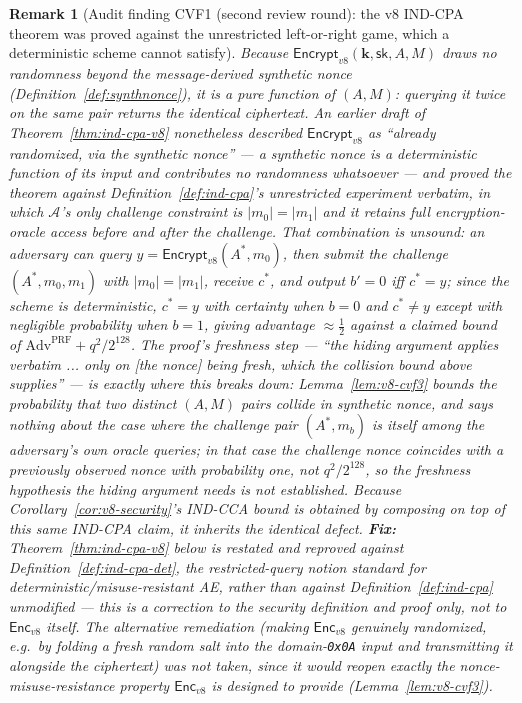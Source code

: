 \documentclass[11pt,a4paper]{article}
\newtheorem{remark}[theorem]{Remark}
\begin{document}
\begin{remark}[Audit finding CVF1 (second review round): the v8 IND-CPA theorem was proved against the unrestricted left-or-right game, which a deterministic scheme cannot satisfy]
\label{rem:cvf25}
Because $\mathsf{Encrypt}_{v8}(\mathbf{k},\mathsf{sk},A,M)$ draws no
randomness beyond the message-derived synthetic nonce
(Definition~\ref{def:synthnonce}), it is a \emph{pure function} of
$(A,M)$: querying it twice on the same pair returns the identical
ciphertext. An earlier draft of Theorem~\ref{thm:ind-cpa-v8} nonetheless
described $\mathsf{Encrypt}_{v8}$ as ``already randomized, via the
synthetic nonce'' --- a synthetic nonce is a deterministic function of its
input and contributes no randomness whatsoever --- and proved the theorem
against Definition~\ref{def:ind-cpa}'s \emph{unrestricted} experiment
verbatim, in which $\mathcal{A}$'s only challenge constraint is
$|m_0|=|m_1|$ and it retains full encryption-oracle access before and
after the challenge. That combination is unsound: an adversary can query
$y=\mathsf{Encrypt}_{v8}(A^*,m_0)$, then submit the challenge
$(A^*,m_0,m_1)$ with $|m_0|=|m_1|$, receive $c^*$, and output $b'=0$ iff
$c^*=y$; since the scheme is deterministic, $c^*=y$ with certainty when
$b=0$ and $c^*\neq y$ except with negligible probability when $b=1$,
giving advantage $\approx\tfrac12$ against a claimed bound of
$\mathrm{Adv}^{\mathrm{PRF}}+q^2/2^{128}$. The proof's freshness step ---
``the hiding argument applies verbatim ... only on [the nonce] being
fresh, which the collision bound above supplies'' --- is exactly where
this breaks down: Lemma~\ref{lem:v8-cvf3} bounds the probability that
\emph{two distinct} $(A,M)$ pairs collide in synthetic nonce, and says
nothing about the case where the challenge pair $(A^*,m_b)$ is itself
among the adversary's own oracle queries; in that case the challenge
nonce coincides with a previously observed nonce with probability
\emph{one}, not $q^2/2^{128}$, so the freshness hypothesis the hiding
argument needs is not established. Because Corollary~\ref{cor:v8-security}'s
IND-CCA bound is obtained by composing on top of this same IND-CPA claim,
it inherits the identical defect. \textbf{Fix:} Theorem~\ref{thm:ind-cpa-v8}
below is restated and reproved against Definition~\ref{def:ind-cpa-det},
the restricted-query notion standard for deterministic/misuse-resistant
AE, rather than against Definition~\ref{def:ind-cpa} unmodified --- this
is a correction to the security definition and proof only, not to
$\mathsf{Enc}_{v8}$ itself. The alternative remediation (making
$\mathsf{Enc}_{v8}$ genuinely randomized, e.g.\ by folding a fresh random
salt into the domain-\texttt{0x0A} input and transmitting it alongside
the ciphertext) was not taken, since it would reopen exactly the
nonce-misuse-resistance property $\mathsf{Enc}_{v8}$ is designed to
provide (Lemma~\ref{lem:v8-cvf3}).
\end{remark}
\end{document}
